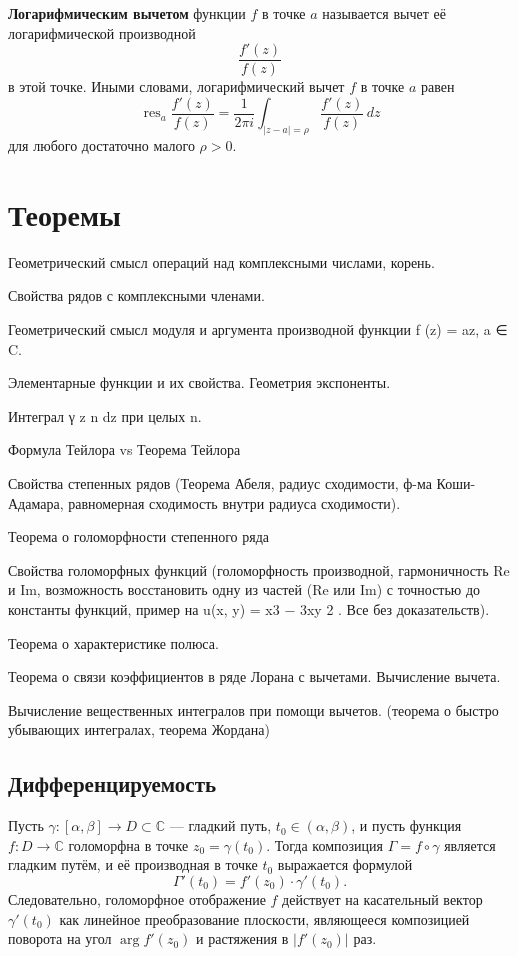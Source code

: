\begin{definition}
\textbf{Логарифмическим вычетом} функции $f$ в точке $a$ называется вычет её логарифмической производной
\[
\frac{f'(z)}{f(z)}
\]
в этой точке. Иными словами, логарифмический вычет $f$ в точке $a$ равен
\[
\operatorname{res}_a \frac{f'(z)}{f(z)} = \frac{1}{2\pi i} \int_{|z-a|=\rho} \frac{f'(z)}{f(z)} \, dz
\]
для любого достаточно малого $\rho > 0$.
\end{definition}

\section{Теоремы}

Геометрический смысл операций над комплексными числами, корень.

Свойства рядов с комплексными членами.

Геометрический смысл модуля и аргумента производной функции f (z) = az, a ∈ C.

Элементарные функции и их свойства. Геометрия экспоненты.

Интеграл γ z n dz при целых n.

Формула Тейлора vs Теорема Тейлора

Свойства степенных рядов (Теорема Абеля, радиус сходимости, ф-ма Коши-Адамара, равномерная сходимость внутри радиуса сходимости).

Теорема о голоморфности степенного ряда

Свойства голоморфных функций (голоморфность производной, гармоничность Re и Im, возможность восстановить одну из частей (Re или Im) с точностью до константы функций, пример на u(x, y) = x3 − 3xy 2 . Все без доказательств).

Теорема о характеристике полюса.

Теорема о связи коэффициентов в ряде Лорана с вычетами. Вычисление вычета.

Вычисление вещественных интегралов при помощи вычетов. (теорема о быстро убывающих интегралах, теорема Жордана)

\subsection{Дифференцируемость}

\begin{theorem}
Пусть $\gamma: [\alpha, \beta] \to D \subset \mathbb{C}$ --- гладкий путь, $t_0 \in (\alpha, \beta)$, и пусть функция $f: D \to \mathbb{C}$ голоморфна в точке $z_0 = \gamma(t_0)$. Тогда композиция $\Gamma = f \circ \gamma$ является гладким путём, и её производная в точке $t_0$ выражается формулой
\[
\Gamma'(t_0) = f'(z_0) \cdot \gamma'(t_0).
\]
Следовательно, голоморфное отображение $f$ действует на касательный вектор $\gamma'(t_0)$ как линейное преобразование плоскости, являющееся композицией поворота на угол $\arg f'(z_0)$ и растяжения в $|f'(z_0)|$ раз.
\end{theorem}

